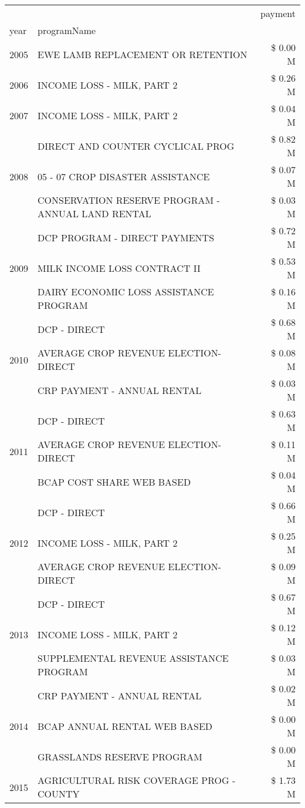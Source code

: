 \begin{tabular}{llr}
\toprule
 &  & payment \\
year & programName &  \\
\midrule
2005 & EWE LAMB REPLACEMENT OR RETENTION & \$ 0.00 M \\
\cline{1-3}
2006 & INCOME LOSS - MILK, PART 2 & \$ 0.26 M \\
\cline{1-3}
2007 & INCOME LOSS - MILK, PART 2 & \$ 0.04 M \\
\cline{1-3}
\multirow[t]{3}{*}{2008} & DIRECT AND COUNTER CYCLICAL PROG & \$ 0.82 M \\
 & 05 - 07 CROP DISASTER ASSISTANCE & \$ 0.07 M \\
 & CONSERVATION RESERVE PROGRAM - ANNUAL LAND RENTAL & \$ 0.03 M \\
\cline{1-3}
\multirow[t]{3}{*}{2009} & DCP PROGRAM - DIRECT PAYMENTS & \$ 0.72 M \\
 & MILK INCOME LOSS CONTRACT II & \$ 0.53 M \\
 & DAIRY ECONOMIC LOSS ASSISTANCE PROGRAM & \$ 0.16 M \\
\cline{1-3}
\multirow[t]{3}{*}{2010} & DCP - DIRECT & \$ 0.68 M \\
 & AVERAGE CROP REVENUE ELECTION-DIRECT & \$ 0.08 M \\
 & CRP PAYMENT - ANNUAL RENTAL & \$ 0.03 M \\
\cline{1-3}
\multirow[t]{3}{*}{2011} & DCP - DIRECT & \$ 0.63 M \\
 & AVERAGE CROP REVENUE ELECTION-DIRECT & \$ 0.11 M \\
 & BCAP COST SHARE WEB BASED & \$ 0.04 M \\
\cline{1-3}
\multirow[t]{3}{*}{2012} & DCP - DIRECT & \$ 0.66 M \\
 & INCOME LOSS - MILK, PART 2 & \$ 0.25 M \\
 & AVERAGE CROP REVENUE ELECTION-DIRECT & \$ 0.09 M \\
\cline{1-3}
\multirow[t]{3}{*}{2013} & DCP - DIRECT & \$ 0.67 M \\
 & INCOME LOSS - MILK, PART 2 & \$ 0.12 M \\
 & SUPPLEMENTAL REVENUE ASSISTANCE PROGRAM & \$ 0.03 M \\
\cline{1-3}
\multirow[t]{3}{*}{2014} & CRP PAYMENT - ANNUAL RENTAL & \$ 0.02 M \\
 & BCAP ANNUAL RENTAL WEB BASED & \$ 0.00 M \\
 & GRASSLANDS RESERVE PROGRAM & \$ 0.00 M \\
\cline{1-3}
\multirow[t]{3}{*}{2015} & AGRICULTURAL RISK COVERAGE PROG - COUNTY & \$ 1.73 M \\

\end{tabular}
